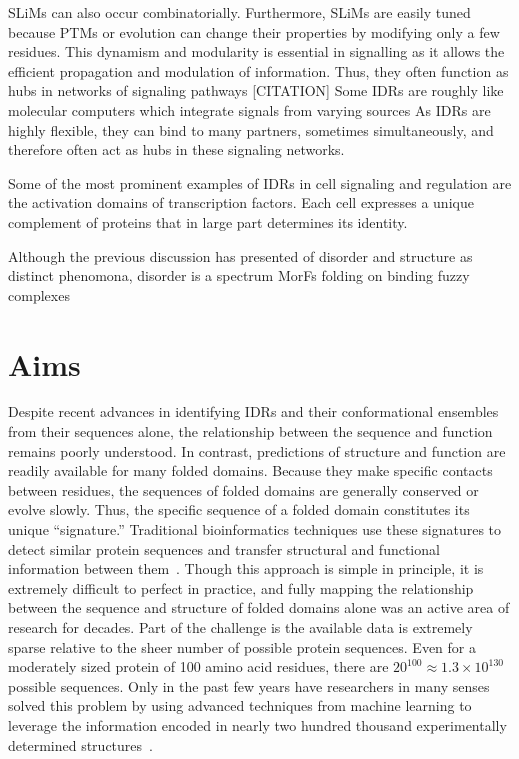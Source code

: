 SLiMs can also occur combinatorially.
Furthermore, SLiMs are easily tuned because PTMs or evolution can change their properties by modifying only a few residues. This dynamism and modularity is essential in signalling as it allows the efficient propagation and modulation of information.
Thus, they often function as hubs in networks of signaling pathways [CITATION]
Some IDRs are roughly like molecular computers which integrate signals from varying sources
As IDRs are highly flexible, they can bind to many partners, sometimes simultaneously, and therefore often act as hubs in these signaling networks.

Some of the most prominent examples of IDRs in cell signaling and regulation are the activation domains of transcription factors. Each cell expresses a unique complement of proteins that in large part determines its identity.

Although the previous discussion has presented of disorder and structure as distinct phenomona, disorder is a spectrum
MorFs
folding on binding
fuzzy complexes

\section{Aims}

Despite recent advances in identifying IDRs and their conformational ensembles from their sequences alone, the relationship between the sequence and function remains poorly understood. In contrast, predictions of structure and function are readily available for many folded domains. Because they make specific contacts between residues, the sequences of folded domains are generally conserved or evolve slowly. Thus, the specific sequence of a folded domain constitutes its unique ``signature.'' Traditional bioinformatics techniques use these signatures to detect similar protein sequences and transfer structural and functional information between them~\cite{Camacho2009, Eddy2009, Mistry2020}. Though this approach is simple in principle, it is extremely difficult to perfect in practice, and fully mapping the relationship between the sequence and structure of folded domains alone was an active area of research for decades. Part of the challenge is the available data is extremely sparse relative to the sheer number of possible protein sequences. Even for a moderately sized protein of 100 amino acid residues, there are $20^{100} \approx 1.3 \times 10^{130}$ possible sequences. Only in the past few years have researchers in many senses solved this problem by using advanced techniques from machine learning to leverage the information encoded in nearly two hundred thousand experimentally determined structures~\cite{Jumper2021}.

